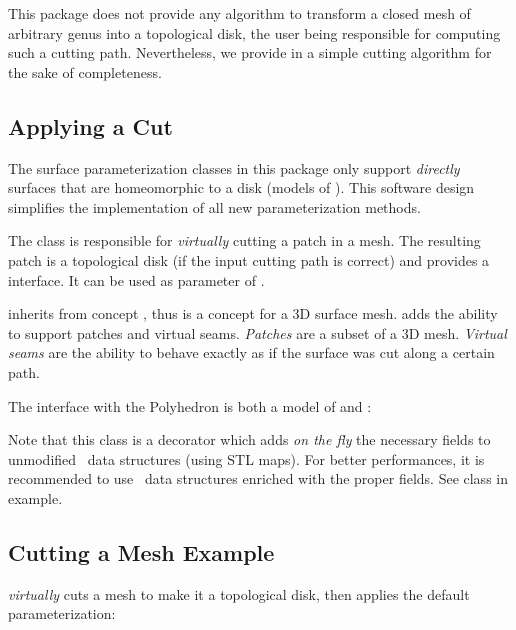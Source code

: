 This package does not provide any algorithm to transform a closed mesh
of arbitrary genus into a topological disk, the user being responsible
for computing such a cutting path. Nevertheless, we provide in
 a simple cutting algorithm for
the sake of completeness.


\subsection{Applying a Cut}

The surface parameterization classes in this package only support
\emph{directly} surfaces that are homeomorphic to a disk (models of
). This software design simplifies the
implementation of all new parameterization methods.

The 
class is responsible for \emph{virtually} cutting
a patch in a  mesh.
The resulting patch is a topological
disk (if the input cutting path is correct)
and provides a  interface. It can be used as
parameter of .

 inherits from concept ,
thus is a concept for a 3D surface mesh.
 adds the ability to support patches and
virtual seams. \emph{Patches} are a subset of a 3D mesh.
\emph{Virtual seams} are the ability
to behave exactly as if the surface was cut along a certain path.

The  interface with the Polyhedron is both a model of
 and : \\

Note that this class is a decorator which adds {\em on the fly}
the necessary fields to unmodified \cgal\ data structures (using STL
maps). For better performances, it is recommended to use \cgal\ data
structures enriched with the proper fields. See 
class in  example.


\subsection{Cutting a Mesh Example}

 \emph{virtually} cuts a
 mesh
to make it a topological disk, then applies the default parameterization:


